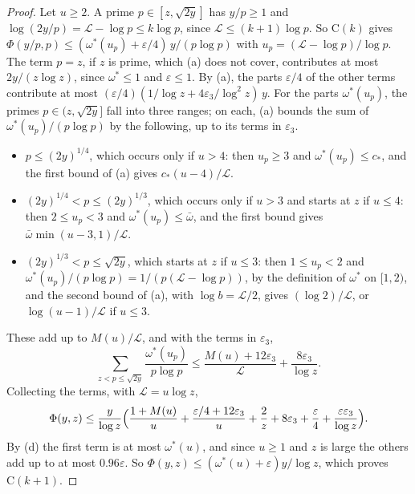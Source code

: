 \documentclass[11pt]{article}
\numberwithin{equation}{section}
\begin{document}
\begin{proof}
Let $u \ge 2$. A prime
$p \in [z, \sqrt{2y}]$ has $y/p \ge 1$ and
$\log(2y/p) = \mathcal L - \log p \le k \log p$, since $\mathcal L \le (k + 1) \log p$. So $\mathrm C(k)$ gives
$\Phi(y/p, p) \le (\omega^*(u_p) + \varepsilon/4) \, y/(p \log p)$ with $u_p = (\mathcal L - \log p)/\log p$. The term
$p = z$, if $z$ is prime, which (a) does not cover, contributes at most $2y/(z \log z)$, since $\omega^* \le 1$ and
$\varepsilon \le 1$. By (a), the parts
$\varepsilon/4$ of the other terms contribute at most $(\varepsilon/4)(1/\log z + 4\varepsilon_3/\log^2 z) \, y$. For
the parts $\omega^*(u_p)$, the primes $p \in (z, \sqrt{2y}]$ fall into three ranges; on each, (a) bounds the sum of
$\omega^*(u_p)/(p \log p)$ by the following, up to its terms in $\varepsilon_3$.
\begin{itemize}
\item $p \le (2y)^{1/4}$, which occurs only if $u > 4$: then $u_p \ge 3$ and $\omega^*(u_p) \le c_*$, and the first
  bound of (a) gives $c_*(u - 4)/\mathcal L$.
\item $(2y)^{1/4} < p \le (2y)^{1/3}$, which occurs only if $u > 3$ and starts at $z$ if $u \le 4$: then $2 \le u_p <
  3$ and $\omega^*(u_p) \le \bar\omega$, and the first bound gives $\bar\omega \min(u - 3, 1)/\mathcal L$.
\item $(2y)^{1/3} < p \le \sqrt{2y}$, which starts at $z$ if $u \le 3$: then $1 \le u_p < 2$ and $\omega^*(u_p)/(p
  \log p) = 1/(p(\mathcal L - \log p))$, by the definition of $\omega^*$ on $[1, 2)$, and the second bound of (a), with
  $\log b = \mathcal L/2$, gives $(\log 2)/\mathcal L$, or $\log(u - 1)/\mathcal L$ if $u \le 3$.
\end{itemize}
These add up to $M(u)/\mathcal L$, and with the terms in $\varepsilon_3$,
\[
  \sum_{z < p \le \sqrt{2y}} \frac{\omega^*(u_p)}{p \log p} \le \frac{M(u) + 12\varepsilon_3}{\mathcal L}
  + \frac{8\varepsilon_3}{\log z}.
\]
Collecting the terms, with $\mathcal L = u \log z$,
\[
  \Phi(y, z) \le \frac y{\log z} \Bigl(\frac{1 + M(u)}u + \frac{\varepsilon/4 + 12\varepsilon_3}u + \frac2z
  + 8\varepsilon_3 + \frac\varepsilon4 + \frac{\varepsilon \varepsilon_3}{\log z}\Bigr).
\]
By (d) the first term is at most $\omega^*(u)$, and since $u \ge 1$ and $z$ is large the others add up to at most
$0.96\varepsilon$. So $\Phi(y, z) \le (\omega^*(u) + \varepsilon) y/\log z$, which proves $\mathrm C(k + 1)$.
\end{proof}
\end{document}

